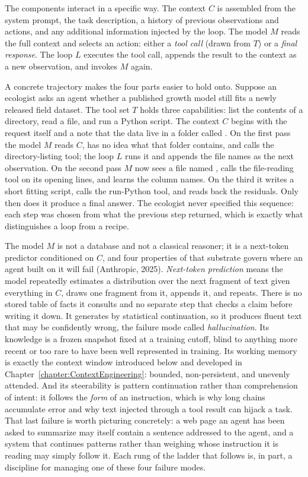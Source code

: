 The components interact in a specific way.
The context $C$ is assembled from the system prompt, the task description, a history of previous observations and actions, and any additional information injected by the loop.
The model $M$ reads the full context and selects an action: either a \emph{tool call} (drawn from $T$) or a \emph{final response}.
The loop $L$ executes the tool call, appends the result to the context as a new observation, and invokes $M$ again.

\begin{example}
A concrete trajectory makes the four parts easier to hold onto.
Suppose an ecologist asks an agent whether a published growth model still fits a newly released field dataset.
The tool set $T$ holds three capabilities: list the contents of a directory, read a file, and run a Python script.
The context $C$ begins with the request itself and a note that the data live in a folder called .
On the first pass the model $M$ reads $C$, has no idea what that folder contains, and calls the directory-listing tool; the loop $L$ runs it and appends the file names as the next observation.
On the second pass $M$ now sees a file named , calls the file-reading tool on its opening lines, and learns the column names.
On the third it writes a short fitting script, calls the run-Python tool, and reads back the residuals.
Only then does it produce a final answer.
The ecologist never specified this sequence: each step was chosen from what the previous step returned, which is exactly what distinguishes a loop from a recipe.
\end{example}

The model $M$ is not a database and not a classical reasoner; it is a next-token predictor conditioned on $C$, and four properties of that substrate govern where an agent built on it will fail (Anthropic, 2025).
\emph{Next-token prediction} means the model repeatedly estimates a distribution over the next fragment of text given everything in $C$, draws one fragment from it, appends it, and repeats.
There is no stored table of facts it consults and no separate step that checks a claim before writing it down.
It generates by statistical continuation, so it produces fluent text that may be confidently wrong, the failure mode called \emph{hallucination}.
Its knowledge is a frozen snapshot fixed at a training cutoff, blind to anything more recent or too rare to have been well represented in training.
Its working memory is exactly the context window introduced below and developed in Chapter~\ref{chapter:ContextEngineering}: bounded, non-persistent, and unevenly attended.
And its steerability is pattern continuation rather than comprehension of intent: it follows the \emph{form} of an instruction, which is why long chains accumulate error and why text injected through a tool result can hijack a task.
That last failure is worth picturing concretely: a web page an agent has been asked to summarize may itself contain a sentence addressed to the agent, and a system that continues patterns rather than weighing whose instruction it is reading may simply follow it.
Each rung of the ladder that follows is, in part, a discipline for managing one of these four failure modes.

